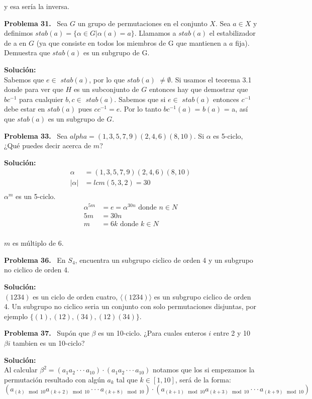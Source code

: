 \documentclass{article}
\newcounter{problem}
\newcounter{solution}
\newcommand\Problem[1]{%
  \stepcounter{problem}%
  \textbf{Problema #1.}~%
  \setcounter{solution}{0}%
}
\newcommand\TheSolution{%
  \textbf{Solución:}\\%
}
\begin{document}
y esa sería la inversa.

\Problem{31} Sea $G$ un grupo de permutaciones en el conjunto $X$. Sea $a \in
X$ y definimos $stab(a) = \{\alpha \in G | \alpha(a) = a\}$. Llamamos a
$stab(a)$ el estabilizador de a en $G$ (ya que consiste en todos los miembros
de G que mantienen a $a$ fija). Demuestra que $stab(a)$ es un subgrupo de G.

\TheSolution{}
Sabemos que $e \in $ $stab(a)$, por lo que $stab(a)$ $\neq \emptyset$. Si
usamos el teorema 3.1 donde para ver que $H$ es un subconjunto de $G$ entonces
hay que demostrar que $bc^{-1}$ para cualquier $b,c \in$ $stab(a)$. Sabemos
que si $e \in$ $stab(a)$ entonces $c^{-1}$ debe estar en $stab(a)$ pues $cc^
{-1} = e$. Por lo tanto $bc^{-1}(a)$ = $b(a)$ = a, así que $stab(a)$ es un
subgrupo de $G$.

\Problem{33} Sea $alpha = (1, 3, 5, 7, 9)(2, 4, 6)(8, 10)$. Si $\alpha$ es
5-ciclo, ¿Qué puedes decir acerca de $m$?

\TheSolution{}
\[
\begin{split}
  \alpha   &= (1, 3, 5, 7, 9)(2, 4, 6)(8, 10) \\
  |\alpha| &= lcm(5,3,2) = 30 \\
\end{split}
\]
  $\alpha^m $ es un 5-ciclo. 
\[
\begin{split}
  \alpha^{5m} &= e = \alpha^{30n} \text{ donde } n \in N \\
  5m &= 30n \\
  m &= 6k \text{ donde } k \in N \\
\end{split}
\]

$m$ es múltiplo de 6.

\Problem{36} En $S_4$, encuentra un subgrupo ciclico de orden 4 y un subgrupo
no ciclico de orden 4.

\TheSolution{} $(1234)$ es un ciclo de orden cuatro, $\langle(1234)\rangle$ es
un subgrupo ciclico de orden 4. Un subgrupo no ciclico seria un conjunto con
solo permutaciones disjuntas, por ejemplo $\{ (1), (12), (34), (12)(34)\}$.

\Problem{37} Supón que $\beta$ es un 10-ciclo. ¿Para cuales enteros $i$ entre
2 y 10 $\beta i$ tambien es un 10-ciclo?

\TheSolution{}
Al calcular $\beta ^{2} = (a_{1}a_{2}\cdot\cdot\cdot a_{10})\cdot (a_{1}a_{2}
\cdot\cdot\cdot a_{10})$  notamos que los si empezamos la permutación
resultado con algún $a_{k}$ tal que $k\in [1,10]$, será de la forma:
\[
  (a_{(k)\mod10}a_{(k+2)\mod10}\cdot\cdot\cdot a_{(k+8)\mod10})\cdot (a_{(k+1)
  \mod10}a_{(k+3)\mod10}\cdot\cdot\cdot a_{(k+9)\mod10})
\]
\end{document}
